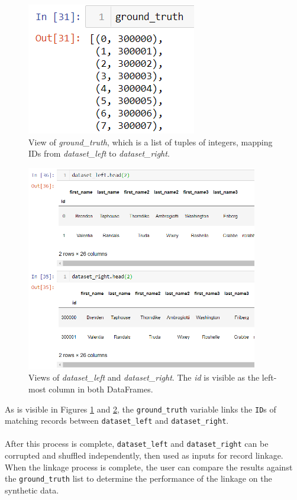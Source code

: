 \documentclass[titlepage, 11pt]{article}
\begin{document}
\begin{figure}[H]
    \centering
    \includegraphics{imgs/mock_data5.PNG}
    \caption{View of \textit{ground\_truth}, which is a list of tuples of integers, mapping IDs from \textit{dataset\_left} to \textit{dataset\_right}.}
    \label{fig:groundt}
\end{figure}

\begin{figure}[H]
    \centering
    \includegraphics[width=0.9\textwidth]{imgs/mock_data6.PNG}
    \caption{Views of \textit{dataset\_left} and \textit{dataset\_right}. The \textit{id} is visible as the left-most column in both DataFrames.}
    \label{fig:datacomp}
\end{figure}

\noindent As is visible in Figures \ref{fig:groundt} and \ref{fig:datacomp}, the \verb|ground_truth| variable links the \verb|ID|s of matching records between \verb|dataset_left| and \verb|dataset_right|. 
\\
\\
\noindent After this process is complete, \verb|dataset_left| and \verb|dataset_right| can be corrupted and shuffled independently, then used as inputs for record linkage. When the linkage process is complete, the user can compare the results against the \verb|ground_truth| list to determine the performance of the linkage on the synthetic data.
\end{document}
